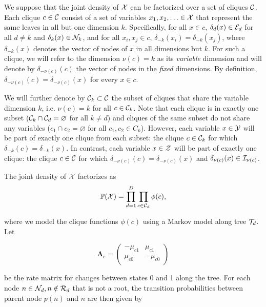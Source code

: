 \documentclass[
11pt, %
oneside, %
english, %
singlespacing, %
headsepline, %
chapterinoneline, %
]{MastersDoctoralThesis} %
\def\P{\mathbb{P}}
\def\E{\mathbb{E}}
\def\bLambda{\boldsymbol{\Lambda}}
\def\Ccal{{\cal C}}
\def\E{{\cal E}}
\def\I{{\cal I}}
\def\N{{\cal N}}
\def\R{{\cal R}}
\def\T{{\cal T}}
\def\X{{\cal X}}
\def\Y{{\cal Y}}
\def\Z{{\cal Z}}
\begin{document}
We suppose that the joint density of $\X$ can be factorized over a set of cliques $\Ccal$. Each clique $c \in \Ccal$ consist of a set of variables $x_1, x_2, \ldots \in \X$ that represent the same leaves in all but one dimension $k$. Specifically, for all $x \in c$, $\delta_d(x) \in \E_d$ for all $d \neq k$ and $\delta_k(x) \in \N_k$, and for all $x_i, x_j \in c$, $\delta_{-k}(x_i) = \delta_{-k}(x_j)$, where $\delta_{-k}(x)$ denotes the vector of nodes of $x$ in all dimensions but $k$. For such a clique, we will refer to the dimension $\nu(c) = k$ as its \emph{variable} dimension and will denote by $\delta_{-\nu(c)}(c)$ the vector of nodes in the \emph{fixed} dimensions. By definition, $\delta_{-\nu(c)}(c)=\delta_{-\nu(c)}(x)$ for every $x \in c$.

We will further denote by $\Ccal_k \subset \Ccal$ the subset of cliques that share the variable dimension $k$, i.e. $\nu(c)=k$ for all $c \in \Ccal_k$. Note that each clique is in exactly one subset ($\Ccal_k \cap \Ccal_d = \varnothing$ for all $k \neq d$) and cliques of the same subset do not share any variables ($c_1 \cap c_2 = \varnothing$ for all $c_1, c_2 \in C_k$). However, each variable $x \in \Y$ will be part of exactly one clique from each subset: the clique $c \in \Ccal_k$ for which $\delta_{-k}(c) = \delta_{-k}(x)$. In contrast, each variable $x \in \Z$ will be part of exactly one clique: the clique $c \in \Ccal$ for which $\delta_{-\nu(c)}(c) = \delta_{-\nu(c)}(x)$ and $\delta_{\nu(c)}(x) \in \I_{\nu(c)}$.

The joint density of $\X$ factorizes as
\begin{equation}
	\P(\X) = \prod_{d=1}^D \prod_{c \in \Ccal_d} \phi(c),
\end{equation}

where
we model the clique functions $\phi(c)$ using a Markov model along tree $\T_d$. Let

\begin{equation}
	\bLambda_c =
	\begin{pmatrix}
		-\mu_{c1} & \mu_{c1}\\
		\mu_{c0} & -\mu_{c0}\\
	\end{pmatrix}
\end{equation}

be the rate matrix for changes between states 0 and 1 along the tree. For each node $n \in \N_d, n \notin \R_d$ that is not a root, the transition probabilities between parent node $p(n)$ and $n$ are then given by
\end{document}
